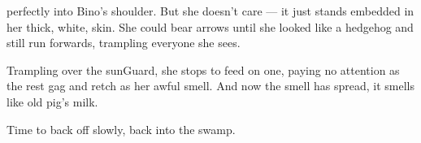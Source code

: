 perfectly into Bino's shoulder.
But she doesn't care --- it just stands embedded in her thick, white, skin.
She could bear arrows until she looked like a hedgehog and still run forwards, trampling everyone she sees.

Trampling over the \gls{sunGuard}, she stops to feed on one, paying no attention as the rest gag and retch as her awful smell.
And now the smell has spread, it smells like old pig's milk.

Time to back off slowly, back into the swamp.

\cyoaEnd

